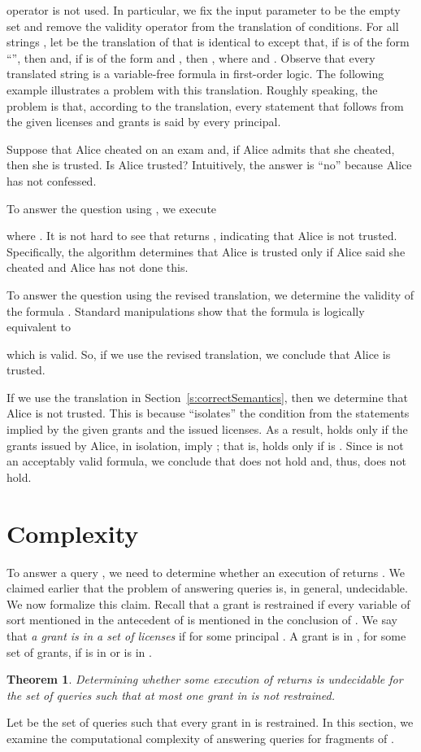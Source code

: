 \documentclass{acmtrans2m}
\newtheorem{theorem}{Theorem}[section]
\newcommand{\thm}{\begin{theorem}}
\newcommand{\xam}{\begin{example}}
\newcommand{\ethm}{\end{theorem}}
\newcommand{\exam}{\bbox\end{example}}
\newcommand{\wbox}{\mbox{\llap{}}}
\newcommand{\bbox}{\wbox}
\newcommand{\<}{
}
\renewcommand{\>}{\rangle}
\begin{document}
operator
is not used.
In particular, we fix the input parameter  to be the empty set and
remove the validity
operator from the translation of  conditions.  For all strings , let
 be the translation of  that is identical to
 except that, if  is of the form ``'', then
 and,
if  is of the form  and , then
,
where  and .
Observe that every translated string is a variable-free formula in first-order logic.
The following example
illustrates a problem
with this translation.
Roughly speaking, the problem is that, according to
the translation, every statement that follows from the given licenses and grants is said by every
principal.
\xam
Suppose that Alice cheated on an exam and, if Alice admits that she cheated, then she is trusted.
Is Alice trusted?  Intuitively, the answer is ``no'' because Alice has not confessed.

\begin{sloppypar}
To answer the question using , we execute

where
.  It is not hard to see that  returns ,
indicating that Alice is not trusted.  Specifically, the algorithm determines that Alice is trusted
 only if Alice said she cheated and Alice has not done this.
\end{sloppypar}

To answer the question using the revised translation, we determine the
validity of the formula 
.
Standard manipulations show that the formula is logically equivalent to

which is valid. So, if we use the revised translation, we conclude that
Alice is trusted.


If we use the translation in Section~\ref{s:correctSemantics}, then we determine that
Alice is not trusted.  This is because  ``isolates'' the  condition
from the statements implied by the given grants and the issued licenses.
As a result,
 holds only if 
the grants issued by Alice, in isolation, imply ; 
that is, 
holds only if  
 is . 
Since  is not an acceptably valid formula, 
we conclude that 
 does not hold and, thus,
 does not hold.
\exam

\section{Complexity}\label{s:trac}
To answer a query , we need to determine whether an execution of
 returns .  We claimed earlier that the problem of answering queries
is, in general, undecidable.  We now formalize this claim.  Recall that a grant  is restrained if
every variable of sort  mentioned in the antecedent of  is mentioned in the conclusion of .
We say that \emph{a grant  is in a set  of licenses} if  for some principal .  A
grant  is in , for some set  of grants, if  is in  or  is in .
\thm\label{t:undec2}
Determining whether some execution of  returns  is undecidable for
the set of queries  such that at most one grant in  is not restrained.
\ethm
Let  be the set of queries  such that every grant in  is restrained.
In this section, we examine the computational complexity of answering queries for fragments of .
\end{document}
